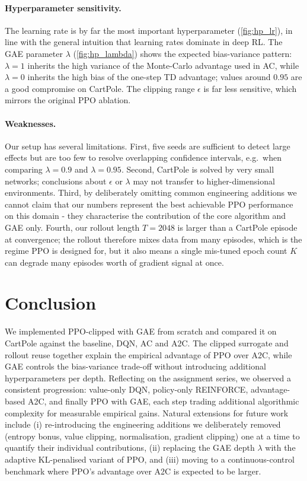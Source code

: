 \documentclass{article}
\theoremstyle{plain}
\theoremstyle{definition}
\theoremstyle{remark}
\begin{document}
\paragraph{Hyperparameter sensitivity.}
The learning rate is by far the most important hyperparameter (\autoref{fig:hp_lr}), in line with the general intuition that learning rates dominate in deep RL. The GAE parameter $\lambda$ (\autoref{fig:hp_lambda}) shows the expected bias-variance pattern: $\lambda=1$ inherits the high variance of the Monte-Carlo advantage used in AC, while $\lambda=0$ inherits the high bias of the one-step TD advantage; values around $0.95$ are a good compromise on CartPole. The clipping range $\epsilon$ is far less sensitive, which mirrors the original PPO ablation.

\paragraph{Weaknesses.}
Our setup has several limitations. First, five seeds are sufficient to detect large effects but are too few to resolve overlapping confidence intervals, e.g.\ when comparing $\lambda=0.9$ and $\lambda=0.95$. Second, CartPole is solved by very small networks; conclusions about $\epsilon$ or $\lambda$ may not transfer to higher-dimensional environments. Third, by deliberately omitting common engineering additions we cannot claim that our numbers represent the best achievable PPO performance on this domain - they characterise the contribution of the core algorithm and GAE only. Fourth, our rollout length $T=2048$ is larger than a CartPole episode at convergence; the rollout therefore mixes data from many episodes, which is the regime PPO is designed for, but it also means a single mis-tuned epoch count $K$ can degrade many episodes worth of gradient signal at once.

\section{Conclusion}\label{sec:conclusion}

We implemented PPO-clipped with GAE from scratch and compared it on CartPole against the baseline, DQN, AC and A2C. The clipped surrogate and rollout reuse together explain the empirical advantage of PPO over A2C, while GAE controls the bias-variance trade-off without introducing additional hyperparameters per depth. Reflecting on the assignment series, we observed a consistent progression: value-only DQN, policy-only REINFORCE, advantage-based A2C, and finally PPO with GAE, each step trading additional algorithmic complexity for measurable empirical gains. Natural extensions for future work include (i) re-introducing the engineering additions we deliberately removed (entropy bonus, value clipping, normalisation, gradient clipping) one at a time to quantify their individual contributions, (ii) replacing the GAE depth $\lambda$ with the adaptive KL-penalised variant of PPO, and (iii) moving to a continuous-control benchmark where PPO's advantage over A2C is expected to be larger.
\end{document}
